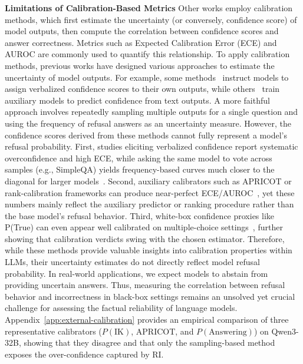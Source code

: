 \noindent\textbf{Limitations of Calibration-Based Metrics}
Other works employ calibration methods, which first estimate the uncertainty (or conversely, confidence score) of model outputs, then compute the correlation between confidence scores and answer correctness.
Metrics such as Expected Calibration Error (ECE) and AUROC are commonly used to quantify this relationship.
To apply calibration methods, previous works have designed various approaches to estimate the uncertainty of model outputs. 
For example, some methods~\citep{xiong2023can} instruct models to assign verbalized confidence scores to their own outputs, while others~\citep{ulmer-etal-2024-calibrating} train auxiliary models to predict confidence from text outputs. 
A more faithful approach involves repeatedly sampling multiple outputs for a single question and using the frequency of refusal answers as an uncertainty measure.
However, the confidence scores derived from these methods cannot fully represent a model's refusal probability. 
First, studies eliciting verbalized confidence report systematic overconfidence and high ECE, while asking the same model to vote across samples (e.g., SimpleQA) yields frequency-based curves much closer to the diagonal for larger models~\citep{xiong2023can,wei2024measuringshortformfactualitylarge}. 
Second, auxiliary calibrators such as APRICOT or rank-calibration frameworks can produce near-perfect ECE/AUROC~\citep{ulmer-etal-2024-calibrating,huang-etal-2024-rank}, yet these numbers mainly reflect the auxiliary predictor or ranking procedure rather than the base model's refusal behavior. 
Third, white-box confidence proxies like P(True) can even appear well calibrated on multiple-choice settings~\citep{kadavath2022mostly}, further showing that calibration verdicts swing with the chosen estimator. 
Therefore, while these methods provide valuable insights into calibration properties within LLMs, their uncertainty estimates do not directly reflect model refusal probability. 
In real-world applications, we expect models to abstain from providing uncertain answers. 
Thus, measuring the correlation between refusal behavior and incorrectness in black-box settings remains an unsolved yet crucial challenge for assessing the factual reliability of language models. Appendix~\ref{app:external-calibration} provides an empirical comparison of three representative calibrators ($P(\mathrm{IK})$, APRICOT, and $P(\mathrm{Answering})$) on Qwen3-32B, showing that they disagree and that only the sampling-based method exposes the over-confidence captured by RI.

